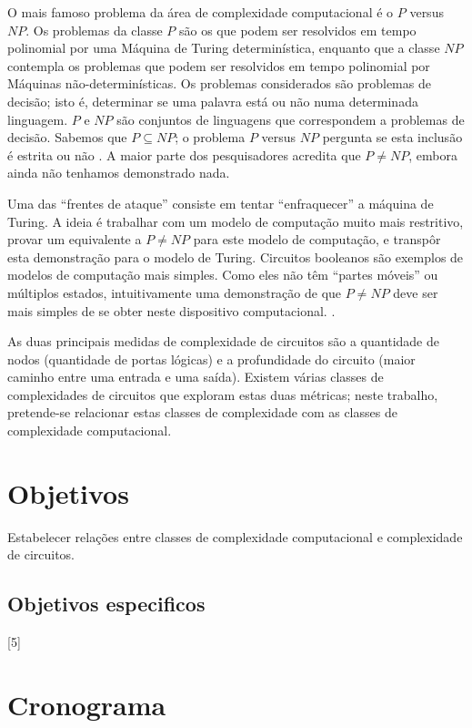 \documentclass[12pt]{article}
\begin{document}
    O mais famoso problema da área de complexidade computacional é o $P$ versus $NP$.
    Os problemas da classe $P$ são os que podem ser resolvidos em tempo polinomial
    por uma Máquina de Turing determinística, enquanto que a classe $NP$ contempla
    os problemas que podem ser resolvidos em tempo polinomial por Máquinas
    não-determinísticas.
    Os problemas considerados são problemas de decisão; isto é, determinar se uma
    palavra está ou não numa determinada linguagem. $P$ e $NP$ são conjuntos de
    linguagens que correspondem a problemas de decisão. Sabemos que $P \subseteq NP$;
    o problema $P$ versus $NP$ pergunta se esta inclusão é estrita ou não \cite{Sipser2006}.
    A maior parte dos pesquisadores acredita que $P \neq NP$,
    embora ainda não tenhamos demonstrado nada.

    Uma das ``frentes de ataque'' consiste em tentar ``enfraquecer'' a máquina de Turing.
    A ideia é trabalhar com um modelo de computação muito mais restritivo,
    provar um equivalente a $P \neq NP$ para este modelo de computação,
    e transpôr esta demonstração para o modelo de Turing.
    Circuitos booleanos são exemplos de modelos de computação mais simples.
    Como eles não têm ``partes móveis'' ou múltiplos estados,
    intuitivamente uma demonstração de que $P \neq NP$ deve ser
    mais simples de se obter neste dispositivo computacional. \cite{Hastad1987}.

    As duas principais medidas de complexidade de circuitos são a quantidade de
    nodos (quantidade de portas lógicas) e a profundidade do circuito
    (maior caminho entre uma entrada e uma saída).
    Existem várias classes de complexidades de circuitos
    que exploram estas duas métricas;
    neste trabalho, pretende-se relacionar estas classes de complexidade
    com as classes de complexidade computacional.

\section{Objetivos}

    Estabelecer relações entre classes de complexidade computacional
    e complexidade de circuitos.

\subsection{Objetivos especificos}

    [5]

\section{Cronograma}
\end{document}
